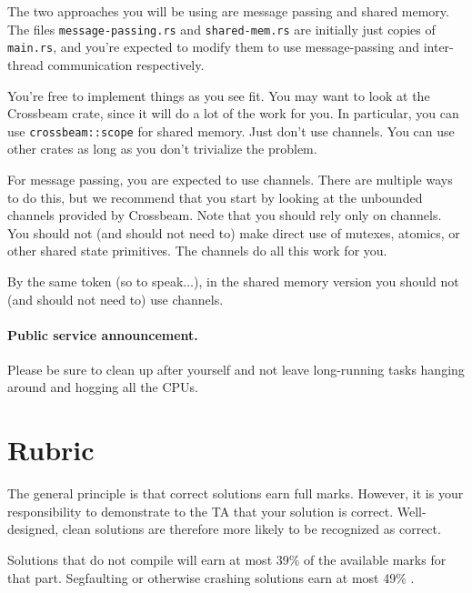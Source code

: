 \documentclass[12pt]{article}
\renewcommand{\_}{\kern-1.5pt\textunderscore\kern-1.5pt}
\begin{document}
\vspace*{1em} \noindent
The two approaches you will be using are message passing and shared memory. The files {\tt message-passing.rs} and {\tt shared-mem.rs} are initially just copies of {\tt main.rs}, and you're expected to modify them to use message-passing and inter-thread communication respectively.\par

\vspace*{1em} \noindent
You're free to implement things as you see fit. You may want to look at the Crossbeam crate, since it will do a lot of the work for you. In particular, you can use {\tt crossbeam::scope} for shared memory. Just don't use channels. You can use other crates as long as you don't trivialize the problem.

\vspace*{1em} \noindent
For message passing, you are expected to use channels. There are multiple ways to do this, but we recommend that you start by looking at the unbounded channels provided by Crossbeam. Note that you should rely only on channels. You should not (and should not need to) make direct use of mutexes, atomics, or other shared state primitives. The channels do all this work for you.\par

\vspace*{1em} \noindent
By the same token (so to speak$ \ldots$), in the shared memory version you should not (and should not need to) use channels.\par

\paragraph{Public service announcement.}  Please be sure to clean up after yourself and not leave long-running tasks hanging around and hogging all the CPUs.

\section*{Rubric}
The general principle is that correct solutions earn full marks. However, it is your responsibility to demonstrate to the TA that your solution is correct. Well-designed, clean solutions are therefore more likely to be recognized as correct. \par

\vspace*{1em} \noindent
Solutions that do not compile will earn at most 39$\%$  of the available marks for that part. Segfaulting or otherwise crashing solutions earn at most 49$\%$ . 
\end{document}
